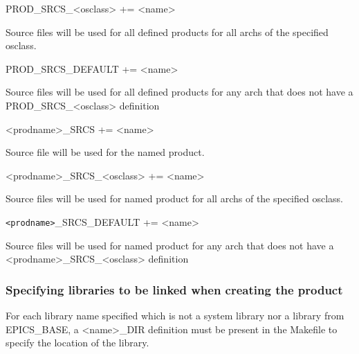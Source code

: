 \begin{description}\item PROD\_SRCS\_\textless{}osclass\textgreater{} += \textless{}name\textgreater{}

\end{description}Source files will be used for all defined products for all archs of the specified osclass.

\begin{description}\item PROD\_SRCS\_DEFAULT += \textless{}name\textgreater{}

\end{description}Source files will be used for all defined products for any arch that does not have a PROD\_SRCS\_\textless{}osclass\textgreater{} 
definition



\begin{description}\item \textless{}prodname\textgreater{}\_SRCS += \textless{}name\textgreater{}

\end{description}Source file will be used for the named product.

\begin{description}\item \textless{}prodname\textgreater{}\_SRCS\_\textless{}osclass\textgreater{} += \textless{}name\textgreater{}

\end{description}Source files will be used for named product for all archs of the specified osclass.

\begin{description}\item \verb|<prodname>|\_SRCS\_DEFAULT += \textless{}name\textgreater{}

\end{description}Source files will be used for named product for any arch that does not have a \textless{}prodname\textgreater{}\_SRCS\_\textless{}osclass\textgreater{} 
definition

\subsubsection{Specifying libraries to be linked when creating the product}

For each library name specified which is not a system library nor a library from EPICS\_BASE, a \textless{}name\textgreater{}\_DIR definition 
must be present in the Makefile to specify the location of the library. 

